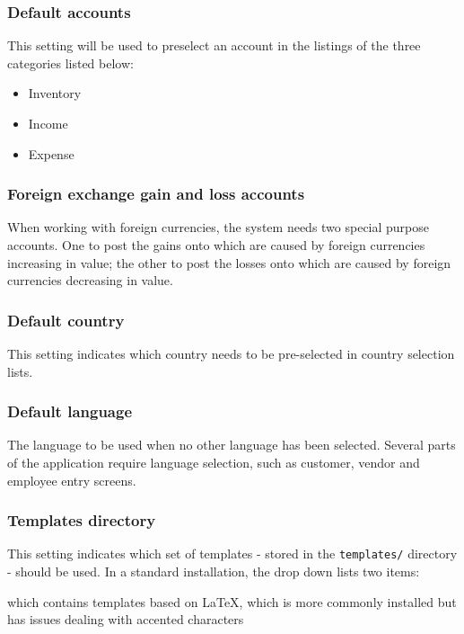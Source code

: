 \subsubsection{Default accounts}
\label{subsubsec-company-config-defaults-accounts}

This setting will be used to preselect an account in
the listings of the three categories listed below:
\begin{itemize}
\item Inventory
\item Income
\item Expense
\end{itemize}


\subsubsection{Foreign exchange gain and loss accounts}
\label{subsubsec-company-config-defaults-fx-accounts}

When working with foreign currencies,
the system needs two special purpose accounts. One to post the gains onto which are
caused by foreign currencies increasing in value; the other to post the losses onto
which are caused by foreign currencies decreasing in value.


\subsubsection{Default country}
\label{subsubsec-company-config-defaults-country}

This setting indicates which country needs to be pre-selected
   in country selection lists.


\subsubsection{Default language}
\label{subsubsec-company-config-defaults-language}

The language to be used when no other language has been selected. Several parts of the
application require language selection, such as customer, vendor and employee entry screens.

\subsubsection{Templates directory}
\label{subsubsec-company-config-defaults-templates}

This setting indicates which set of templates - stored in the
   \texttt{templates/} directory - should be used. In a standard installation, the drop down
   lists two items:
\begin{description}[style=nextline]
   \item [demo] which contains templates based on \LaTeX, which is more commonly installed but has issues dealing with accented characters
   \end{description}


